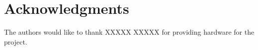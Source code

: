 \documentclass[conference]{IEEEtran}
\begin{document}
\section*{Acknowledgments}

The authors would like to thank XXXXX XXXXX for providing hardware for the
project.














\end{document}
